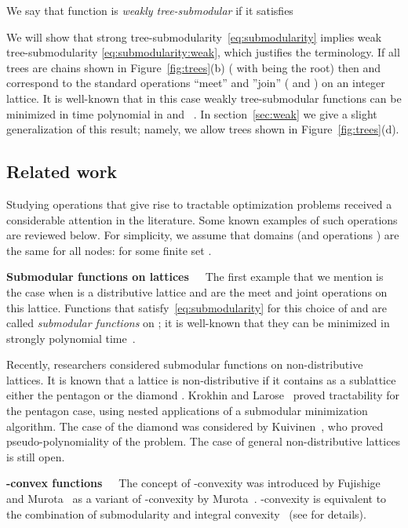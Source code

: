 \documentclass[11pt,onecolumn]{article}
\newcommand{\myparagraph}[1]{{\vspace*{2pt}\noindent\bf{#1}~~}}
\begin{document}
We say that function  is {\em weakly tree-submodular} if it satisfies

We will show that strong tree-submodularity~\eqref{eq:submodularity} implies weak tree-submodularity \eqref{eq:submodularity:weak},
which justifies the terminology. If all trees are chains shown in Figure~\ref{fig:trees}(b) ( with  being the root)
then  and  correspond to the standard operations ``meet'' and ''join'' ( and ) on an integer lattice.
It is well-known that in this case weakly tree-submodular functions can be minimized in time polynomial in  and ~\cite{Topkis:78,Murota:book}.
In section~\ref{sec:weak} we give a slight generalization of this result; namely, we allow trees shown in Figure~\ref{fig:trees}(d).



\subsection{Related work} 
Studying operations  that give rise to tractable optimization problems received a considerable attention in the literature. Some known examples of
such operations are reviewed below. For simplicity, we assume that domains  (and operations ) are the same for all nodes:
 for some finite set .


\myparagraph{Submodular functions on lattices} 
The first example that we mention is the case when  is a distributive lattice and  
are the meet and joint operations on this lattice. Functions that satisfy~\eqref{eq:submodularity} for this choice of  and  
are called {\em submodular functions} on ; it is well-known that they can be minimized in strongly polynomial time~\cite{Grotschel:88,Schrijver:00,Iwata:01}.

Recently, researchers considered submodular functions on non-distributive lattices.
It is known that a lattice is non-distributive if it contains as a sublattice either the pentagon 
or the diamond .
Krokhin and Larose~\cite{KrokhinLarose:08} proved tractability for the pentagon case, using nested applications of a submodular minimization algorithm.
The case of the diamond was considered by Kuivinen~\cite{Kuivinen:TR}, who proved pseudo-polynomiality of the problem.
The case of general non-distributive lattices is still open.

\myparagraph{-convex functions}
The concept of -convexity was introduced by Fujishige and Murota~\cite{FujishigeMurota:00} as a variant of -convexity by Murota~\cite{Murota:98}. -convexity is equivalent to the combination of submodularity and integral 
convexity~\cite{FavatiTardella:90} (see \cite{Murota:book} for details).
\end{document}

